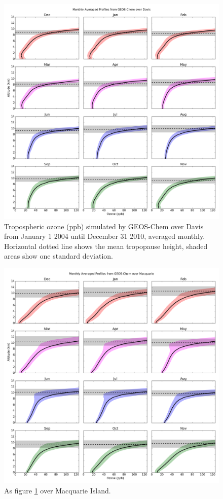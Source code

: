     \begin{figure}[!htbp]
      \includegraphics[width=\textwidth]{Figures/Ozone/Davis_GC_monthprofiles.png}
      \caption{Tropospheric ozone (ppb) simulated by GEOS-Chem over Davis from January 1 2004 until December 31 2010, averaged monthly.
      Horizontal dotted line shows the mean tropopause height, shaded areas show one standard deviation.}
      \label{ch_o3:fig:GEOSChemMonthlyProfilesDavis}
    \end{figure}
    \begin{figure}[!htbp]
      \includegraphics[width=\textwidth]{Figures/Ozone/Macquarie_GC_monthprofiles.png}
      \caption{As figure \ref{ch_o3:fig:GEOSChemMonthlyProfilesDavis} over Macquarie Island.}
      \label{ch_o3:fig:GEOSChemMonthlyProfilesMacquarie}
    \end{figure}
